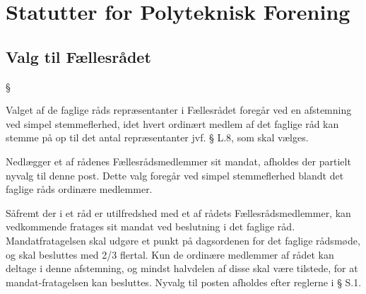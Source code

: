 \setcounter{section}{19}
\setcounter{subsection}{0}
\section*{Statutter for Polyteknisk Forening}
\label{kap:valgtilfaellesraad}
\subsection{Valg til Fællesrådet}

\begin{list}
{\S {}}{}

\item Valget af de faglige råds repræsentanter i Fællesrådet foregår ved en afstemning ved simpel stemmeflerhed,
           idet hvert ordinært medlem af det faglige råd kan stemme på op til det antal repræsentanter jvf. § L.8, som
               skal vælges.
\item Nedlægger et af rådenes Fællesrådsmedlemmer sit mandat, afholdes der partielt nyvalg til denne post. Dette
          valg foregår ved simpel stemmeflerhed blandt det faglige råds ordinære medlemmer.
\item \label{S.3} Såfremt der i et råd er utilfredshed med et af rådets Fællesrådsmedlemmer, kan vedkommende fratages sit
           mandat ved beslutning i det faglige råd.
           Mandatfratagelsen skal udgøre et punkt på dagsordenen for det faglige rådsmøde, og skal besluttes med 2/3
              flertal. Kun de ordinære medlemmer af rådet kan deltage i denne afstemning, og mindst halvdelen af disse
               skal være tilstede, for at mandat-fratagelsen kan besluttes.
               Nyvalg til posten afholdes efter reglerne i § S.1.

\end{list}
